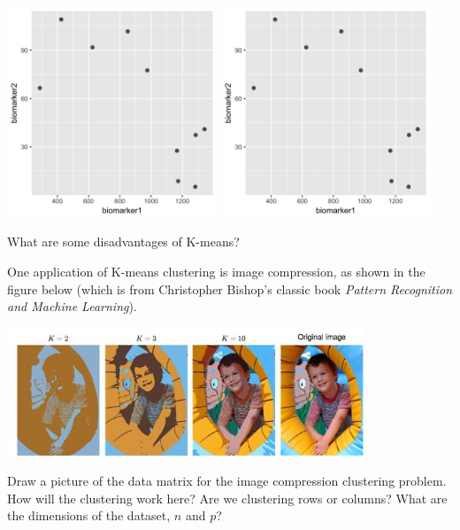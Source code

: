 \begin{question}{}
\begin{center}
\includegraphics[width=0.47\textwidth]{img/biomarker-data-plain.png}
\includegraphics[width=0.47\textwidth]{img/biomarker-data-plain.png}
\end{center}
\end{question}

\begin{question}{}
What are some disadvantages of K-means?
\end{question}

\begin{question}{}
One application of K-means clustering is image compression, as shown in the figure below (which is from Christopher Bishop's classic book \emph{Pattern Recognition and Machine Learning}). 
\begin{center}
\includegraphics[width=0.8\textwidth]{img/cmm-bishop-kmeans.jpg}
\end{center}
Draw a picture of the data matrix for the image compression clustering problem. How will the clustering work here? Are we clustering rows or columns? What are the dimensions of the dataset, $n$ and $p$?
\end{question}

